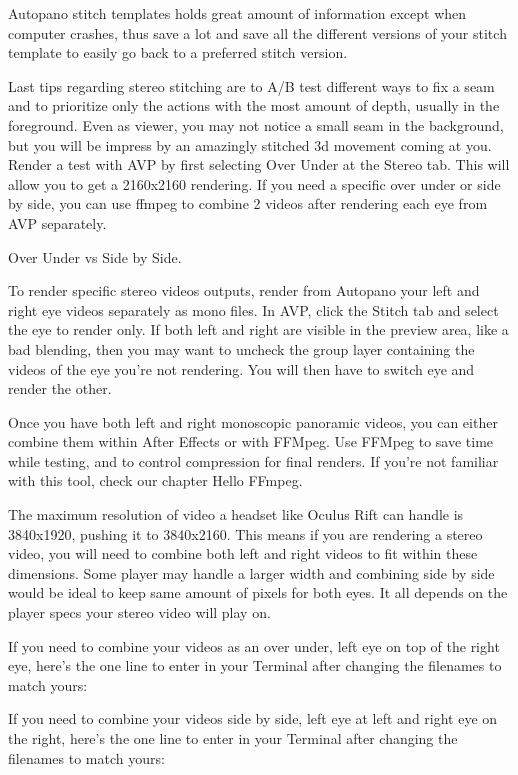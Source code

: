 \begin{fullwidth}
Autopano stitch templates holds great amount of information except when computer crashes, thus save a lot and save all the different versions of your stitch template to easily go back to a preferred stitch version. 
\clearpage


Last tips regarding stereo stitching are to A/B test different ways to fix a seam and to prioritize only the actions with the most amount of depth, usually in the foreground. Even as viewer, you may not notice a small seam in the background, but you will be impress by an amazingly stitched 3d movement coming at you. Render a test with AVP by first selecting Over Under at the Stereo tab. This will allow you to get a 2160x2160 rendering. If you need a specific over under or side by side, you can use ffmpeg to combine 2 videos after rendering each eye from AVP separately.

\clearpage
{\large Over Under vs Side by Side. \par}

To render specific stereo videos outputs, render from Autopano your left and right eye videos separately as mono files. In AVP, click the Stitch tab and select the eye to render only. If both left and right are visible in the preview area, like a bad blending, then you may want to uncheck the group layer containing the videos of the eye you’re not rendering. You will then have to switch eye and render the other.

Once you have both left and right monoscopic panoramic videos, you can either combine them within After Effects or with FFMpeg. Use FFMpeg to save time while testing, and to control compression for final renders. If you’re not familiar with this tool, check our chapter Hello FFmpeg. 

The maximum resolution of video a headset like Oculus Rift can handle is 3840x1920, pushing it to 3840x2160. This means if you are rendering a stereo video, you will need to combine both left and right videos to fit within these dimensions. Some player may handle a larger width and combining side by side would be ideal to keep same amount of pixels for both eyes. It all depends on the player specs your stereo video will play on. 

If you need to combine your videos as an over under, left eye on top of the right eye, here’s the one line to enter in your Terminal after changing the filenames to match yours:


If you need to combine your videos side by side, left eye at left and right eye on the right, here’s the one line to enter in your Terminal after changing the filenames to match yours:




\clearpage
\end{fullwidth}
